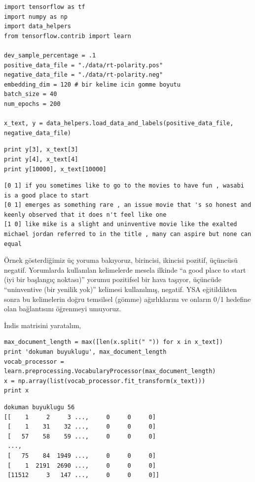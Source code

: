 \documentclass[12pt,fleqn]{article}\usepackage{../../common}
\begin{document}
\begin{verbatim}
import tensorflow as tf
import numpy as np
import data_helpers
from tensorflow.contrib import learn

dev_sample_percentage = .1
positive_data_file = "./data/rt-polarity.pos"
negative_data_file = "./data/rt-polarity.neg"
embedding_dim = 120 # bir kelime icin gomme boyutu
batch_size = 40
num_epochs = 200

x_text, y = data_helpers.load_data_and_labels(positive_data_file, negative_data_file)
\end{verbatim}

\begin{verbatim}
print y[3], x_text[3]
print y[4], x_text[4]
print y[10000], x_text[10000]
\end{verbatim}

\begin{verbatim}
[0 1] if you sometimes like to go to the movies to have fun , wasabi is a good place to start
[0 1] emerges as something rare , an issue movie that 's so honest and keenly observed that it does n't feel like one
[1 0] like mike is a slight and uninventive movie like the exalted michael jordan referred to in the title , many can aspire but none can equal
\end{verbatim}

Örnek gösterdiğimiz üç yoruma bakıyoruz, birincisi, ikincisi pozitif,
üçüncüsü negatif. Yorumlarda kullanılan kelimelerde mesela ilkinde ``a good
place to start (iyi bir başlangıç noktası)'' yorumu pozitifsel bir hava
taşıyor, üçüncüde ``uninventive (bir yenilik yok)'' kelimesi kullanılmış,
negatif. YSA eğitildikten sonra bu kelimelerin doğru temsilsel (gömme)
ağırlıklarını ve onların 0/1 hedefine olan bağlantısını öğrenmeyi umuyoruz.

İndis matrisini yaratalım,

\begin{verbatim}
max_document_length = max([len(x.split(" ")) for x in x_text])
print 'dokuman buyuklugu', max_document_length
vocab_processor = learn.preprocessing.VocabularyProcessor(max_document_length)
x = np.array(list(vocab_processor.fit_transform(x_text)))
print x
\end{verbatim}

\begin{verbatim}
dokuman buyuklugu 56
[[    1     2     3 ...,     0     0     0]
 [    1    31    32 ...,     0     0     0]
 [   57    58    59 ...,     0     0     0]
 ..., 
 [   75    84  1949 ...,     0     0     0]
 [    1  2191  2690 ...,     0     0     0]
 [11512     3   147 ...,     0     0     0]]
\end{verbatim}
\end{document}
